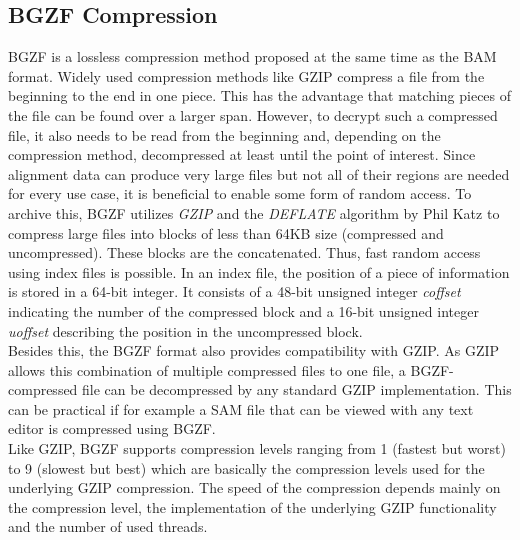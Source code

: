 \subsection{BGZF Compression}
BGZF is a lossless compression method proposed at the same time as the BAM format. Widely used compression methods like GZIP compress a file from the beginning to the end in one piece. This has the advantage that matching pieces of the file can be found over a larger span. However, to decrypt such a compressed file, it also needs to be read from the beginning and, depending on the compression method, decompressed at least until the point of interest. Since alignment data can produce very large files but not all of their regions are needed for every use case, it is beneficial to enable some form of random access. To archive this, BGZF utilizes \textit{GZIP} \cite{gzip} and the \textit{DEFLATE} algorithm \cite{deflate} by Phil Katz to compress large files into blocks of less than 64KB size (compressed and uncompressed). These blocks are the concatenated. Thus, fast random access using index files is possible. In an index file, the position of a piece of information is stored in a 64-bit integer. It consists of a 48-bit unsigned integer \textit{coffset} indicating the number of the compressed block and a 16-bit unsigned integer \textit{uoffset} describing the position in the uncompressed block. \\
Besides this, the BGZF format also provides compatibility with GZIP. As GZIP allows this combination of multiple compressed files to one file, a BGZF-compressed file can be decompressed by any standard GZIP implementation. This can be practical if for example a SAM file that can be viewed with any text editor is compressed using BGZF. \\
Like GZIP, BGZF supports compression levels ranging from 1 (fastest but worst) to 9 (slowest but best) which are basically the compression levels used for the underlying GZIP compression. The speed of the compression depends mainly on the compression level, the implementation of the underlying GZIP functionality and the number of used threads.

